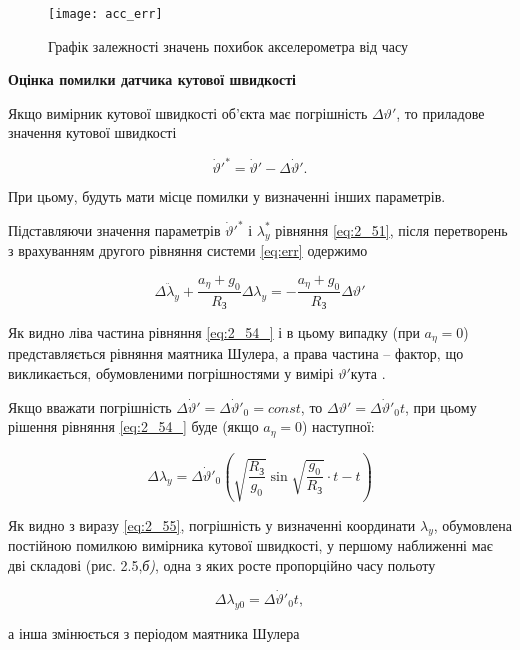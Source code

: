\begin{figure}
\centering
\texttt{[image: acc\_err]}
\caption{Графік залежності значень похибок акселерометра від часу}
\label{fig:acc_err}
\end{figure} 
\vline 

\textbf{Оцінка помилки датчика кутової швидкості}

Якщо вимірник кутової швидкості об'єкта має погрішність $\Delta \vartheta '$, то приладове значення кутової швидкості

\[\dot{\vartheta }'^{*} =\dot{\vartheta }'-\Delta \dot{\vartheta }'.\] 

При цьому, будуть мати місце помилки у визначенні інших параметрів.

Підставляючи значення параметрів $\dot{\vartheta }'^{*} $ і  $\lambda _{y}^{*} $ рівняння \eqref{eq:2_51},  
після перетворень з врахуванням другого рівняння системи \eqref{eq:err} одержимо

\begin{equation} 
\label{eq:2_54_} 
\Delta \ddot{\lambda }_{y} +\frac{a_{\eta } +g_{0} }{R_{\text{З}} } \Delta \lambda _{y} =-\frac{a_{\eta } +g_{0} }{R_{\text{З}} } \Delta \vartheta ' 
\end{equation} 

Як видно ліва частина рівняння \eqref{eq:2_54_} і в цьому випадку (при $a_{\eta } =0$) представляється рівняння 
маятника Шулера, а права частина -- фактор, що викликається, обумовленими погрішностями у вимірі $\vartheta '$кута .

Якщо вважати погрішність $\Delta \dot{\vartheta }'=\Delta \dot{\vartheta }'_{0} =const$, то $\Delta \vartheta '=\Delta \dot{\vartheta }'_{0} t$, 
при цьому рішення рівняння 
\eqref{eq:2_54_} буде (якщо $a_{\eta } =0$) наступної:

\begin{equation} 
\label{eq:2_55} 
\Delta \lambda _{y} =\Delta \dot{\vartheta }'_{0} \left(\sqrt{\frac{R_{\text{З}} }{g_{0} } } \sin \sqrt{\frac{g_{0} }{R_{\text{З}} } } \cdot t-t\right)
\end{equation} 


Як видно з виразу \eqref{eq:2_55},  погрішність у визначенні координати  $\lambda _{y} $, обумовлена 
постійною  помилкою  вимірника кутової швидкості, у першому наближенні має дві складові (рис. 2.5,\textit{б)}, 
одна  з яких  росте пропорційно  часу польоту

\[\Delta \lambda _{y0} =\Delta \dot{\vartheta }'_{0} t,\] 

а інша  змінюється з періодом маятника Шулера

